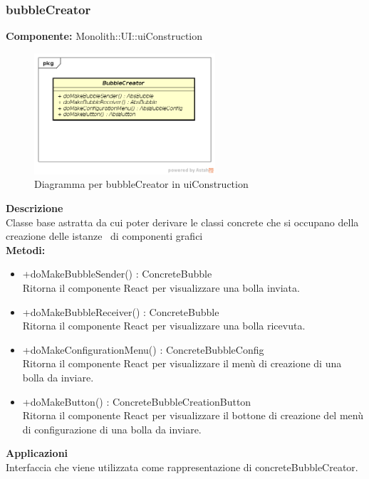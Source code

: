 \subsubsection{bubbleCreator}
\textbf{Componente:}  Monolith::UI::uiConstruction\\
   \FloatBarrier
   \begin{figure}[ht]
   \centering
   \includegraphics[width=0.6\textwidth]{img/single-bubbleCreator.png}
   \caption{{Diagramma per bubbleCreator in uiConstruction}}
\end{figure}
\FloatBarrier
\textbf{Descrizione}\\
Classe base astratta da cui poter derivare le classi concrete che si occupano della creazione delle istanze  di componenti grafici  \\ 
\textbf{Metodi:}
\begin{itemize}
\item +doMakeBubbleSender() : ConcreteBubble 
\\
Ritorna il componente React per visualizzare una bolla inviata.
\item +doMakeBubbleReceiver() : ConcreteBubble 
\\
Ritorna il componente React per visualizzare una bolla ricevuta.
\item +doMakeConfigurationMenu() : ConcreteBubbleConfig 
\\
Ritorna il componente React per visualizzare il menù di creazione di una bolla da inviare.
\item +doMakeButton() : ConcreteBubbleCreationButton 
\\
Ritorna il componente React per visualizzare il bottone di creazione del menù di configurazione di una bolla da inviare.

\end{itemize} 


\textbf{Applicazioni}\\
Interfaccia che viene utilizzata come rappresentazione di concreteBubbleCreator. 


